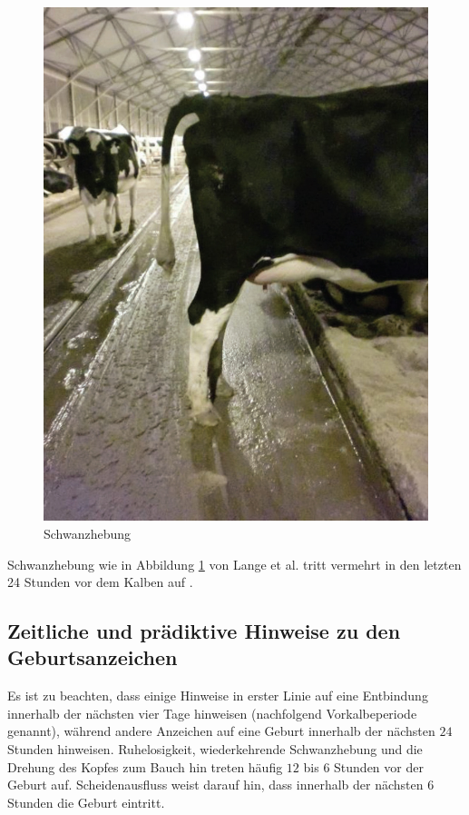 \begin{figure}[H]
	\center
	\includegraphics[scale=.45]{Grafiken/schwanzhebung.jpg}
	\caption{Schwanzhebung}
	\label{fig: Schwanzhebung}
\end{figure}

Schwanzhebung wie in Abbildung  \ref{fig: Schwanzhebung} von Lange et al. tritt vermehrt in den letzten 24 Stunden vor dem Kalben auf \cite[S. 1 f.]{Lange2017}.
\subsection{Zeitliche und prädiktive Hinweise zu den Geburtsanzeichen}
Es ist zu beachten, dass einige Hinweise in erster Linie auf eine Entbindung innerhalb der nächsten vier Tage hinweisen (nachfolgend Vorkalbeperiode genannt), während andere Anzeichen auf eine Geburt innerhalb der nächsten $24$ Stunden hinweisen. Ruhelosigkeit, wiederkehrende Schwanzhebung und die Drehung des Kopfes zum Bauch hin treten häufig $12$ bis $6$ Stunden vor der Geburt auf. Scheidenausfluss weist darauf hin, dass innerhalb der nächsten $6$ Stunden die Geburt eintritt. \citep[S. 1]{Lange2017}

